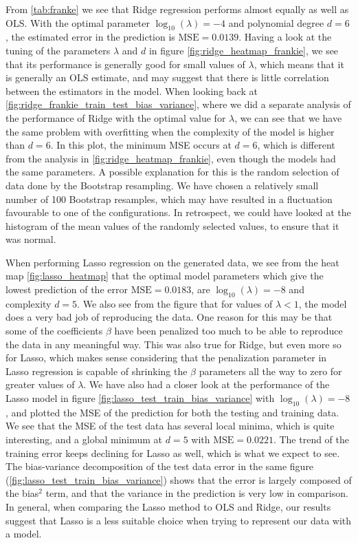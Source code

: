 From \ref{tab:franke} we see that Ridge regression performs almost equally as well as OLS. With the optimal parameter $\log_{10}(\lambda) = -4$ and polynomial degree $d = 6$, the estimated error in the prediction is $\text{MSE} = 0.0139$. Having a look at the tuning of the parameters $\lambda$ and $d$ in figure \ref{fig:ridge_heatmap_frankie}, we see that its performance is generally good for small values of $\lambda$, which means that it is generally an OLS estimate, and may suggest that there is little correlation between the estimators in the model. When looking back at \ref{fig:ridge_frankie_train_test_bias_variance}, where we did a separate analysis of the performance of Ridge with the optimal value for $\lambda$, we can see that we have the same problem with overfitting when the complexity of the model is higher than $d = 6$. In this plot, the minimum MSE occurs at $d = 6$, which is different from the analysis in \ref{fig:ridge_heatmap_frankie}, even though the models had the same parameters. A possible explanation for this is the random selection of data done by the Bootstrap resampling. We have chosen a relatively small number of 100 Bootstrap resamples, which may have resulted in a fluctuation favourable to one of the configurations. In retrospect, we could have looked at the histogram of the mean values of the randomly selected values, to ensure that it was normal.

When performing Lasso regression on the generated data, we see from the heat map \ref{fig:lasso_heatmap} that the optimal model parameters which give the lowest prediction of the error $\text{MSE} = 0.0183$, are $\log_{10}(\lambda) = -8$ and complexity $d = 5$. We also see from the figure that for values of $\lambda < 1$, the model does a very bad job of reproducing the data. One reason for this may be that some of the coefficients $\beta$ have been penalized too much to be able to reproduce the data in any meaningful way. This was also true for Ridge, but even more so for Lasso, which makes sense considering that the penalization parameter in Lasso regression is capable of shrinking the $\beta$ parameters all the way to zero for greater values of $\lambda$. We have also had a closer look at the performance of the Lasso model in figure \ref{fig:lasso_test_train_bias_variance} with $\log_{10}(\lambda) = -8$, and plotted the MSE of the prediction for both the testing and training data. We see that the MSE of the test data has several local minima, which is quite interesting, and a global minimum at $d=5$ with $\text{MSE}=0.0221$. The trend of the training error keeps declining for Lasso as well, which is what we expect to see. The bias-variance decomposition of the test data error in the same figure (\ref{fig:lasso_test_train_bias_variance}) shows that the error is largely composed of the bias$^2$ term, and that the variance in the prediction is very low in comparison. In general, when comparing the Lasso method to OLS and Ridge, our results suggest that Lasso is a less suitable choice when trying to represent our data with a model. 


